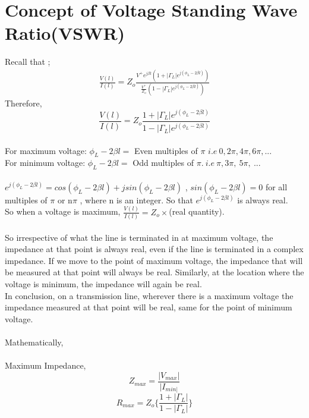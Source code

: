 \section{Concept of Voltage Standing Wave Ratio(VSWR)}
Recall that ;
\begin{align*}
\frac{V(l)}{I(l)} = Z_o \frac{V^{+}e^{j\beta l}(1+ |\Gamma_L|e^{j(\phi_L- 2 \beta l)})}{\frac{V^{+}}{Z_o}(1- |\Gamma_L|e^{j(\phi_L- 2\beta l)})}
\end{align*}
Therefore,
\begin{equation*}
\frac{V(l)}{I(l)} = Z_o \frac{1+ |\Gamma_L|e^{j(\phi_L- 2 \beta l)}}{1- |\Gamma_L|e^{j(\phi_L- 2\beta l)}}
\end{equation*}\\
For maximum voltage: $\phi_L-2\beta l=$ Even multiples of $\pi$ $i.e\ 0, 2\pi, 4\pi,  6\pi,...$\\
For minimum voltage:  $\phi_L-2\beta l=$ Odd multiples of $\pi. \ i.e\ \pi, 3\pi,\ 5\pi,\ ...$\\\\
$e^{j(\phi_L - 2 \beta l)} = cos(\phi_L - 2 \beta l) + jsin(\phi_L - 2 \beta l)$ , $sin(\phi_L - 2 \beta l) = 0$ for all multiples of $\pi$ or n$\pi$ , where n is an integer. So that $e^{j(\phi_L - 2 \beta l)} $ is always real.\\
So when a voltage is maximum, $\frac{V(l)}{I(l)} = Z_o \times$(real quantity).\\\\ 
So irrespective of what the line is terminated in at maximum voltage, the impedance at that point is always real, even if the line is terminated in a complex impedance. If we move to the point of maximum voltage, the impedance that will be measured at that point will always be real. Similarly, at the location where the voltage is minimum, the impedance will again be real.\\ In conclusion, on a transmission line, wherever there is a maximum voltage the impedance measured at that point will be real, same for the point of minimum voltage.\\\\
Mathematically,\\\\
Maximum Impedance, 
\begin{equation}
Z_{max} = \frac{|V_{max}|}{|I_{min|}}
\end{equation}
\begin{equation}
R_{max}= Z_o\{\frac{1+|\Gamma_L|}{1-|\Gamma_L|}\}
\end{equation}\\
